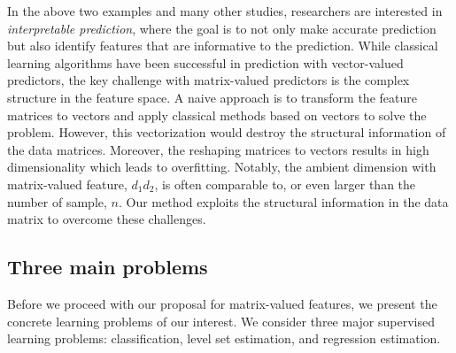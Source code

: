 \documentclass[12pt]{article}
\begin{document}
In the above two examples and many other studies, researchers are interested in \emph{interpretable prediction}, where the goal is to not only make accurate prediction but also identify features that are informative to the prediction. While classical learning algorithms have been successful in prediction with vector-valued predictors, the key challenge with matrix-valued predictors is the complex structure in the feature space. 
A naive approach is to transform the feature matrices to vectors and apply classical methods based on vectors to solve the problem. However, this vectorization would destroy the structural information of the data matrices. Moreover, the reshaping matrices to vectors results in high dimensionality which leads to overfitting. Notably, the ambient dimension with matrix-valued feature, $d_1d_2$, is often comparable to, or even larger than the number of sample, $n$. 
Our method exploits the structural information in the data matrix to overcome these challenges. 


\subsection{Three main problems}
Before we proceed with our proposal for matrix-valued features, we present the concrete learning problems of our interest. We consider three major supervised learning problems: classification, level set estimation, and regression estimation.
\end{document}
